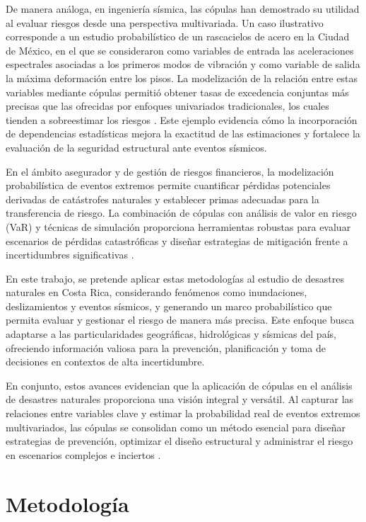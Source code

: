 \documentclass[12pt, a4paper]{article}
\begin{document}
De manera análoga, en ingeniería sísmica, las cópulas han demostrado su utilidad al evaluar riesgos desde una perspectiva multivariada. Un caso ilustrativo corresponde a un estudio probabilístico de un rascacielos de acero en la Ciudad de México, en el que se consideraron como variables de entrada las aceleraciones espectrales asociadas a los primeros modos de vibración y como variable de salida la máxima deformación entre los pisos. La modelización de la relación entre estas variables mediante cópulas permitió obtener tasas de excedencia conjuntas más precisas que las ofrecidas por enfoques univariados tradicionales, los cuales tienden a sobreestimar los riesgos \cite{Siddiqui2022}. Este ejemplo evidencia cómo la incorporación de dependencias estadísticas mejora la exactitud de las estimaciones y fortalece la evaluación de la seguridad estructural ante eventos sísmicos.

En el ámbito asegurador y de gestión de riesgos financieros, la modelización probabilística de eventos extremos permite cuantificar pérdidas potenciales derivadas de catástrofes naturales y establecer primas adecuadas para la transferencia de riesgo. La combinación de cópulas con análisis de valor en riesgo (VaR) y técnicas de simulación proporciona herramientas robustas para evaluar escenarios de pérdidas catastróficas y diseñar estrategias de mitigación frente a incertidumbres significativas \cite{PerezGarcia2004}.

En este trabajo, se pretende aplicar estas metodologías al estudio de desastres naturales en Costa Rica, considerando fenómenos como inundaciones, deslizamientos y eventos sísmicos, y generando un marco probabilístico que permita evaluar y gestionar el riesgo de manera más precisa. Este enfoque busca adaptarse a las particularidades geográficas, hidrológicas y sísmicas del país, ofreciendo información valiosa para la prevención, planificación y toma de decisiones en contextos de alta incertidumbre.

En conjunto, estos avances evidencian que la aplicación de cópulas en el análisis de desastres naturales proporciona una visión integral y versátil. Al capturar las relaciones entre variables clave y estimar la probabilidad real de eventos extremos multivariados, las cópulas se consolidan como un método esencial para diseñar estrategias de prevención, optimizar el diseño estructural y administrar el riesgo en escenarios complejos e inciertos \cite{DelfinerGutierrez2025,Siddiqui2022,PerezGarcia2004}.

\newpage
\section*{Metodología}
\end{document}
